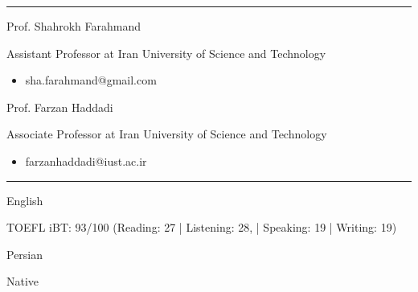 \documentclass[a4paper,10pt]{article}
\newlength{\cvcolumngapwidth}
\newlength{\cvleftcolumnwidth}
\newlength{\cvrightcolumnwidth}
\newcommand{\cvsectionstyle}[1]{{\normalsize\cvsectionfont\textcolor{cvsectioncolor}{#1}}}
\newcommand{\cvheadingstyle}[1]{{\normalsize\cvheadingfont\textcolor{cvheadingcolor}{#1}}}
\newlength{\cvafteritemskipamount}
\newlength{\cvaftersectionskipamount}
\newlength{\cvbetweensectionandheadingextraskipamount}
\newlength{\cvparskip}
\newcommand{\cvsection}[1]{
    \begin{minipage}[t]{\cvleftcolumnwidth}
        \raggedleft\cvsectionstyle{#1}
    \end{minipage}%
    \hspace{\cvcolumngapwidth}%
    \begin{minipage}[t]{\cvrightcolumnwidth}
        \textcolor{cvrulecolor}{\rule{\cvrightcolumnwidth}{0.3mm}}
    \end{minipage}

    \vspace{\cvaftersectionskipamount}
}
\newcommand{\cvitem}[2]{
    \begin{minipage}[t]{\cvleftcolumnwidth}
        \raggedleft #1
    \end{minipage}%
    \hspace{\cvcolumngapwidth}%
    \begin{minipage}[t]{\cvrightcolumnwidth}
        \setlength{\parskip}{\cvparskip} #2
    \end{minipage}

    \vspace{\cvafteritemskipamount}
}
\begin{document}
\cvsection{Reference}
\vspace{\cvbetweensectionandheadingextraskipamount}
\cvitem{
    \cvheadingstyle{Prof. Shahrokh Farahmand}
}{
    {Assistant Professor at Iran University of Science and Technology}
    \begin{itemize}[leftmargin=*]
        \item sha.farahmand@gmail.com
    \end{itemize}
}
\vspace{-4mm}
\cvitem{
    \cvheadingstyle{Prof. Farzan Haddadi}
}{
    {Associate Professor at Iran University of Science and Technology}
    \begin{itemize}[leftmargin=*]
        \item farzanhaddadi@iust.ac.ir
    \end{itemize}
}

\cvsection{Language}
\vspace{\cvbetweensectionandheadingextraskipamount}
\cvitem{
    \cvheadingstyle{English}
}{
    {TOEFL iBT: 93/100 (Reading: 27 | Listening: 28, | Speaking: 19 | Writing: 19)}
}
\vspace{-4mm}
\cvitem{
    \cvheadingstyle{Persian}
}{
    Native
}
\end{document}
